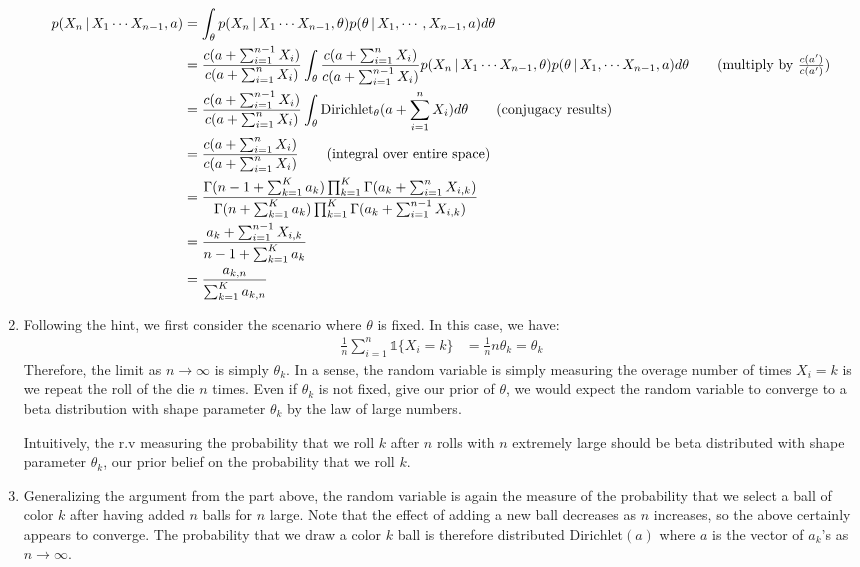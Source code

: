 \documentclass[submit]{harvardml}
\newcommand{\given}{\,|\,}
\theoremstyle{plain}
\begin{document}
\begin{enumerate}[label=(\alph*)]
\begin{align*}
p(X_n \given X_1 \cdots X_{n-1},a) &= \int_{\theta} p(X_n \given  X_1 \cdots X_{n-1}, \theta)p(\theta \given X_1, \cdots, X_{n-1}, a)  d\theta \\
&= \frac{c(a + \sum_{i=1}^{n-1}X_i)}{c(a + \sum_{i=1}^n X_i)} \int_{\theta} \frac{c(a + \sum_{i=1}^n X_i)}{c(a + \sum_{i=1}^{n-1}X_i)} p(X_n \given  X_1 \cdots X_{n-1}, \theta)p(\theta \given X_1, \cdots X_{n-1}, a) d\theta \tag{multiply by $\frac{c(a')}{c(a')}$} \\
&= \frac{c(a + \sum_{i=1}^{n-1}X_i)}{c(a + \sum_{i=1}^n X_i)} \int_{\theta} \text{Dirichlet}_{\theta}(a + \sum_{i=1}^n X_i) d\theta \tag{conjugacy results}\\
&= \frac{c(a + \sum_{i=1}^n X_i)}{c(a + \sum_{i=1}^n X_i)} \tag{integral over entire space} \\
&= \frac{\Gamma(n - 1 + \sum_{k=1}^{K}{a_k})\prod_{k=1}^K \Gamma(a_k + \sum_{i=1}^n X_{i,k})}{\Gamma(n + \sum_{k=1}^K a_k)\prod_{k=1}^K \Gamma(a_k + \sum_{i=1}^{n-1}X_{i,k})} \\
&= \frac{a_k + \sum_{i=1}^{n-1}X_{i,k}}{n - 1 + \sum_{k=1}^K a_k}\\
&= \frac{a_{k,n}}{\sum_{k=1}^K a_{k,n}}
\end{align*}
\item Following the hint, we first consider the scenario where $\theta$ is fixed. In this case, we have:
\begin{align*}
\frac{1}{n} \sum_{i=1}^n \mathbb{1} \{X_i = k\} &= \frac{1}{n}n\theta_k = \theta_k
\end{align*}
Therefore, the limit as $n \to \infty$ is simply $\theta_k$. In a sense, the random variable is simply measuring the overage number of times $X_i = k$ is we repeat the roll of the die $n$ times. Even if $\theta_k$ is not fixed, give our prior of $\theta$, we would expect the random variable to converge to a beta distribution with shape parameter $\theta_k$ by the law of large numbers.

Intuitively, the r.v measuring the probability that we roll $k$ after $n$ rolls with $n$ extremely large should be beta distributed with shape parameter $\theta_k$, our prior belief on the probability that we roll $k$.

\item Generalizing the argument from the part above, the random variable is again the measure of the probability that we select a ball of color $k$ after having added $n$ balls for $n$ large. Note that the effect of adding a new ball decreases as $n$ increases, so the above certainly appears to converge. The probability that we draw a color $k$ ball is therefore distributed $\text{Dirichlet}(a)$ where $a$ is the vector of $a_k$'s as $n \to \infty.$


\end{enumerate}
\end{document}
